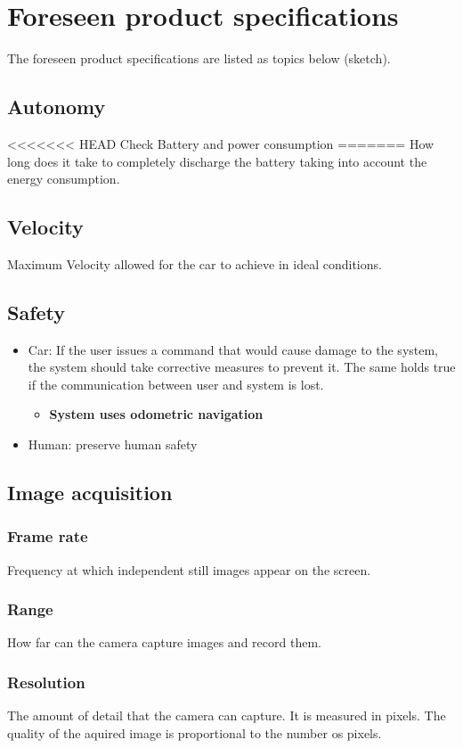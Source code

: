 \section{Foreseen product specifications}
\label{sec:org31f7574}
The foreseen product specifications are listed as topics below (sketch).

\subsection{Autonomy}
<<<<<<< HEAD
\label{sec:orge975868}
Check Battery and power consumption
=======
\label{sec:org7364ba5}
How long does it take to completely discharge the battery taking into account the energy consumption.
\subsection{Velocity}
\label{sec:org08718bc}
Maximum Velocity allowed for the car to achieve in ideal conditions.
\subsection{Safety}
\label{sec:org83942c3}
\begin{itemize}
\item Car: If the user issues a command that would cause damage to the system, the
system should take corrective measures to prevent it. The same holds true if
the communication between user and system is lost.
\begin{itemize}
\item \textbf{System uses odometric navigation}
\end{itemize}
\item Human: preserve human safety
\end{itemize}
\subsection{Image acquisition}
\label{sec:orgb6a5f66}
\subsubsection{Frame rate}
\label{sec:org5adf4ee}
Frequency at which independent still images appear on the screen.
\subsubsection{Range}
\label{sec:orgecb044c}
How far can the camera capture images and record them.
\subsubsection{Resolution}
\label{sec:orgba87554}
The amount of detail that the camera can capture. It is measured in pixels. The quality of the aquired image is proportional to the number os pixels.
